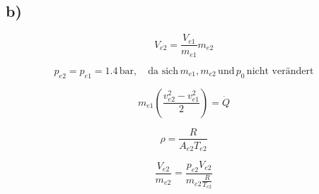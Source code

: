 

\subsection*{b)}

\[
V_{e2} = \frac{V_{e1}}{m_{e1}} m_{e2}
\]

\[
p_{e2} = p_{e1} = 1.4 \, \text{bar}, \quad \text{da sich} \, m_{e1}, m_{e2} \, \text{und} \, p_0 \, \text{nicht verändert}
\]

\[
m_{e1} \left( \frac{v_{e2}^2 - v_{e1}^2}{2} \right) = \dot{Q}
\]

\[
\rho = \frac{R}{A_{e2} T_{e2}}
\]

\[
\frac{V_{e2}}{m_{e2}} = \frac{p_{e2} V_{e2}}{m_{e2} \frac{R}{T_{e2}}}
\]